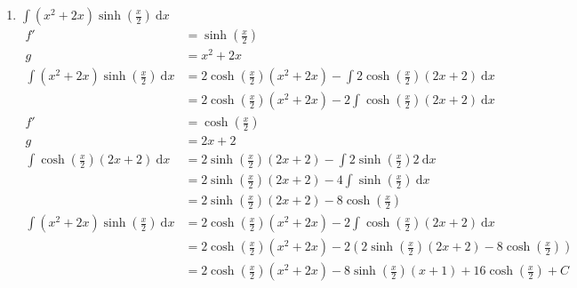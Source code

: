 \documentclass[10pt]{article}
\begin{document}
\begin{enumerate}[start=5,leftmargin=1in]
\begin{enumerate}
        \item $\int (x^2 + 2x) \sinh\left(\frac{x}{2}\right) \: \text{d}x$
        \begin{align*}
            f' &= \sinh\left(\frac{x}{2}\right) \\
            g &= x^2 + 2x \\
            \int (x^2 + 2x) \sinh\left(\frac{x}{2}\right) \: \text{d}x &= 2 \cosh\left(\frac{x}{2}\right) (x^2 + 2x) - \int 2 \cosh\left(\frac{x}{2}\right) (2x + 2) \: \text{d}x \\
            &= 2 \cosh\left(\frac{x}{2}\right) (x^2 + 2x) - 2 \int \cosh\left(\frac{x}{2}\right) (2x + 2) \: \text{d}x \\
            f' &= \cosh\left(\frac{x}{2}\right) \\
            g &= 2x + 2 \\
            \int \cosh\left(\frac{x}{2}\right) (2x + 2) \: \text{d}x &= 2 \sinh\left(\frac{x}{2}\right) (2x + 2) - \int 2 \sinh\left(\frac{x}{2}\right) 2 \: \text{d}x \\
            &= 2 \sinh\left(\frac{x}{2}\right) (2x + 2) - 4 \int \sinh\left(\frac{x}{2}\right) \: \text{d}x \\
            &= 2 \sinh\left(\frac{x}{2}\right) (2x + 2) - 8 \cosh\left(\frac{x}{2}\right) \\
            \int (x^2 + 2x) \sinh\left(\frac{x}{2}\right) \: \text{d}x &= 2 \cosh\left(\frac{x}{2}\right) (x^2 + 2x) - 2 \int \cosh\left(\frac{x}{2}\right) (2x + 2) \: \text{d}x \\
            &= 2 \cosh\left(\frac{x}{2}\right) (x^2 + 2x) - 2 (2 \sinh\left(\frac{x}{2}\right) (2x + 2) - 8 \cosh\left(\frac{x}{2}\right)) \\
            &= 2 \cosh\left(\frac{x}{2}\right) (x^2 + 2x) - 8 \sinh\left(\frac{x}{2}\right) (x + 1) + 16 \cosh\left(\frac{x}{2}\right) + C
        \end{align*}


\end{enumerate}
\end{enumerate}
\end{document}
